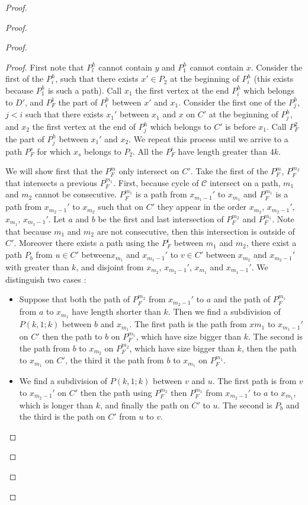 \documentclass[utf8,10pt]{article}
\theoremstyle{plain}
\theoremstyle{definition}
\theoremstyle{remark}
\begin{document}
\begin{proof}
\begin{proof}
\begin{proof}
\begin{proof}
First note that $P_l^h$ cannot contain $y$ and $P_1^h$ cannot contain $x$.
Consider the first of the $P_i^h$, such that there exists $x' \in P_2$ at the beginning of $P_i^h$
(this exists because $P_1^h$ is such a path). Call $x_1$ the first vertex at the end $P_i^h$ which belongs to
$D'$, and $P_F^1$ the part of $P_i^h$ between $x'$ and $x_1$.
Consider the first one of the $P_j^h$, $j<i$ such that there exists $x_1'$ between $x_1$ and $x$ on
$C'$ at the beginning of $P_j^h$, and $x_2$ the first vertex at the end of $P_j^h$ which belongs to $C'$ is before $x_1$.
Call $P_F^2$ the part of $P_j^h$ between $x_1'$ and $x_2$.
We repeat this process until we arrive to a path $P_F^s$ for which $x_s$ belongs to $P_2$.
All the $P_F^i$ have length greater than $4k$.

We will show first that the $P_F^m$ only intersect on $C'$. Take the first of the $P_F^m$, $P_F^{m_2}$ that intersects
a previous $P_F^{m_1}$. First, because cycle of $\mathcal{C}$ intersect on a path, $m_1$ and $m_2$ cannot be consecutive.
$P_F^{m_1}$ is a path from $x_{m_1-1}'$ to $x_{m_1}$ and  $P_F^{m_1}$ is a path from $x_{m_2-1}'$ to $x_{m_2}$ such that on $C'$ they appear
in the order $x_{m_2}$, $x_{m_2-1}'$, $x_{m_1}$, $x_{m_1-1}'$.
Let $a$ and $b$ be the first and last intersection of $P_F^{m_2}$ and $P_F^{m_1}$.
Note that because $m_1$ and $m_2$ are not consecutive, then this intersection is outside of $C'$.
Moreover there exists a path using the $P_F^i$ between $m_1$ and $m_2$, there exist a path $P_b$ from $u \in C'$
between$x_{m_1}$ and $x_{m_1-1}'$ to $v \in C'$ between $x_{m_2}$ and $x_{m_2-1}'$ with greater than $k$,
and disjoint from $x_{m_2}$, $x_{m_2-1}'$, $x_{m_1}$ and $x_{m_1-1}'$. We distinguish two cases :
\begin{itemize}
	\item Suppose that both the path of $P_F^{m_2}$ from $x_{m_2-1}'$ to $a$ and the path of $P_F^{m_1}$ from $a$ to $x_{m_1}$ have
	length shorter than $k$. Then we find a subdivision of $P(k,1;k)$ between $b$ and $x_{m_1}$. The first path is the path from
	$x{m_1}$ to $x_{m_1-1}'$ on $C'$ then the path to $b$ on $P_F^{m_1}$, which have size bigger than $k$.
	The second is the path from $b$ to $x_{m_2}$ on $P_F^{m_2}$, which have size bigger than $k$,
	then the path to $x_{m_1}$ on $C'$, the third it the path from $b$ to $x_{m_1}$ on $P_F^{m_1}$.
	\item We find a subdivision of $P(k,1;k)$ between $v$ and $u$. The first path is from $v$ to $x_{m_2-1}'$ on $C'$ then the
	path using $P_F^{m_2}$ then  $P_F^{m_1}$ from  $x_{m_2-1}'$ to $a$ to $x_{m_1}$, which is longer than $k$,
	and finally the path on $C'$ to $u$. The second is $P_b$ and the third is the path on $C'$ from $u$ to $v$.
\end{itemize}



\end{proof}
\end{proof}
\end{proof}
\end{proof}
\end{document}
